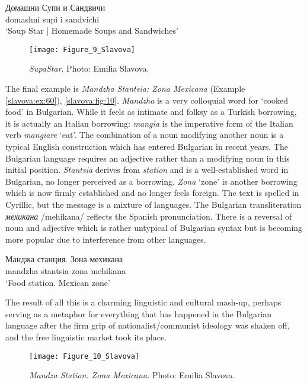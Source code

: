 \documentclass[output=paper]{langscibook}
\begin{document}
\begin{exe}
  \ex\label{slavova:ex:59}
   Домашни Супи и Сандвичи \\
  { } domashni supi i sandvichi \\
  \glt ‘Soup Star | Homemade Soups and Sandwiches’
\end{exe}

\begin{figure}
  \texttt{[image: Figure\_9\_Slavova]}
  \caption{\textit{SupaStar}. Photo: Emilia Slavova.}
  \label{slavova:fig:9}
\end{figure}


The final example is \textit{Mandzha Stantsia: Zona Mexicana} (Example \ref{slavova:ex:60}), \autoref{slavova:fig:10}. \textit{Mandzha} is a very colloquial word for ‘cooked food’ in Bulgarian. While it feels as intimate and folksy as a Turkish borrowing, it is actually an Italian borrowing: \textit{mangia} is the imperative form of the Italian verb \textit{mangiare} ‘eat’. The combination of a noun modifying another noun is a typical English construction which has entered Bulgarian in recent years. The Bulgarian language requires an adjective rather than a modifying noun in this initial position. \textit{Stantsia} derives from \textit{station} and is a well-established word in Bulgarian, no longer perceived as a borrowing. \textit{Zona} ‘zone’ is another borrowing which is now firmly established and no longer feels foreign. The text is spelled in Cyrillic, but the message is a mixture of languages. The Bulgarian transliteration \textit{мехикана} /mehikana/ reflects the Spanish pronunciation. There is a reversal of noun and adjective which is rather untypical of Bulgarian syntax but is becoming more popular due to interference from other languages.

\begin{exe}
  \ex\label{slavova:ex:60}
  \gll Манджа станция. Зона мехикана \\
  mandzha stantsia zona mehikana \\
  \glt ‘Food station. Mexican zone’
\end{exe}

\noindent
The result of all this is a charming linguistic and cultural mash-up, perhaps serving as a metaphor for everything that has happened in the Bulgarian language after the firm grip of nationalist/communist ideology was shaken off, and the free linguistic market took its place.

\begin{figure}
  \texttt{[image: Figure\_10\_Slavova]}
  \caption{\textit{Mandza Station. Zona Mexicana.} Photo: Emilia Slavova.}
  \label{slavova:fig:10}
\end{figure}
\end{document}
